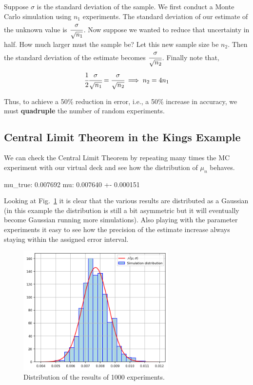 Suppose $\sigma$ is the standard deviation of the sample. We first conduct a Monte Carlo simulation using $n_1$ experiments. The standard deviation of our estimate of the unknown value is $\cfrac{\sigma}{\sqrt{n_1}}$. Now suppose we wanted to reduce that uncertainty in half. How much larger must the sample be? Let this new sample size be $n_2$. Then the standard deviation of the estimate becomes $\cfrac{\sigma}{\sqrt{n_2}}$.
Finally note that,
\begin{equation*}
  \cfrac{1}{2}\cfrac{\sigma}{\sqrt{n_1}}  = \cfrac{\sigma}{\sqrt{n_2}} \implies n_2 = 4 n_1
\end{equation*}

Thus, to achieve a 50\% reduction in error, i.e., a 50\% increase in accuracy, we must \textbf{quadruple} the number of random experiments.

\subsection{Central Limit Theorem in the Kings Example}

We can check the Central Limit Theorem by repeating many times the MC experiment with our virtual deck and see how the distribution of $\mu_n$ behaves.

\begin{ioutput}
mu_true: 0.007692
mu: 0.007640 +- 0.000151
\end{ioutput}

Looking at Fig.~\ref{fig:repeated_MC} it is clear that the various results are distributed as a Gaussian (in this example the distribution is still a bit asymmetric but it will eventually become Gaussian running more simulations). Also playing with the parameter experiments it easy to see how the precision of the estimate increase always staying within the assigned error interval.

\begin{figure}[htb]
\centering
\includegraphics[width=0.7\textwidth]{figures/experiment_distribution}
\caption{Distribution of the results of 1000 experiments.}
\label{fig:repeated_MC}
\end{figure}

